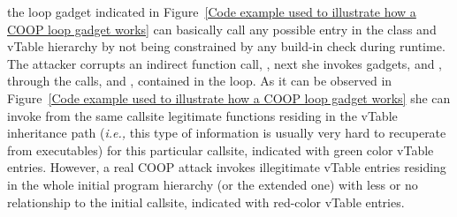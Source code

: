 the loop gadget indicated in Figure~\ref{Code example used to illustrate how a COOP loop gadget works}
can basically call any possible entry in the class and vTable hierarchy by not being constrained by any build-in check during
runtime. The attacker corrupts an indirect function call, , 
next she invokes gadgets,   and , 
through the calls,  and , contained in the loop. 
As it can be observed in Figure~\ref{Code example used to illustrate how a COOP loop gadget works} she 
can invoke from the same callsite legitimate functions residing in the vTable inheritance path
(\textit{i.e.,} this type of information is usually very hard to recuperate from executables)
for this particular callsite, indicated with green color vTable entries. 
However, a real COOP attack invokes illegitimate
vTable entries residing in the whole initial program hierarchy (or the extended one)
with less or no relationship to the initial callsite,
indicated with red-color vTable entries.

